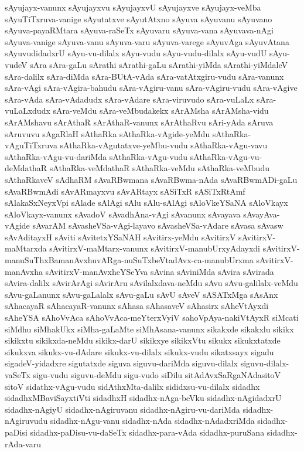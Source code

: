 {sAyujayx-vanunx
sAyujayxvu
sAyujayxvU
sAyujayxve
sAyujayx-veMba
sAyuTiTxruva-vanige
sAyutatxve
sAyutAtxno
sAyuva
sAyuvanu
sAyuvano
sAyuva-payaRMtara
sAyuva-raSeTx
sAyuvaru
sAyuva-vana
sAyuvava-nAgi
sAyuva-vanige
sAyuva-vanu
sAyuva-varu
sAyuva-varege
sAyuvAga
sAyuvAtana
sAyuvudidadxrU
sAyu-vu-dilalx
sAyu-vudu
sAyu-vudu-dilalx
sAyu-vudU
sAyu-vudeV
sAra
sAra-gaLu
sArathi
sArathi-gaLu
sArathi-yiMda
sArathi-yiMdaleV
sAra-dalilx
sAra-diMda
sAra-BUtA-vAda
sAra-vatAtxgiru-vudu
sAra-vanunx
sAra-vAgi
sAra-vAgira-bahudu
sAra-vAgiru-vanu
sAra-vAgiru-vudu
sAra-vAgive
sAra-vAda
sAra-vAdadudx
sAra-vAdare
sAra-viruvudo
sAra-vuLaLx
sAra-vuLaLxdudx
sAra-veMdu
sAra-veMbudakekx
sArAMsha
sArAMsha-vidu
sArAMshavu
sArAthaR
sArAthaR-vanunx
sArAthaRvu
sAri-yAda
sAruva
sAruvuvu
sAgaRlaH
sAthaRka
sAthaRka-vAgide-yeMdu
sAthaRka-vAguTiTxruva
sAthaRka-vAgutatxve-yeMbu-vudu
sAthaRka-vAgu-vavu
sAthaRka-vAgu-vu-dariMda
sAthaRka-vAgu-vudu
sAthaRka-vAgu-vu-deMdathaR
sAthaRka-veMdathaR
sAthaRka-veMdu
sAthaRka-veMbudu
sAthaRkaveV
sAdhaRM
sAvaRBwmana
sAvaRBwma-nAda
sAvaRBwmADi-gaLu
sAvaRBwmAdi
sAvARmayxvu
sAvARtayx
sASiTxR
sASiTxRtAmf
sAlakaSxNeyxVpi
sAlade
sAlAgi
sAlu
sAlu-sAlAgi
sAloVkeYSaNA
sAloVkayx
sAloVkayx-vanunx
sAvadoV
sAvadhAna-vAgi
sAvanunx
sAvayava
sAvayAva-vAgide
sAvarAM
sAvasheVSa-vAgi-layavo
sAvasheVSa-vAdare
sAvasa
sAvasw
sAvAditayxH
sAviti
sAvitetxYSaNAH
sAvitirx-yeMdu
sAvitirxV
sAvitirxV-maMtarxda
sAvitirxV-maMtarx-vanunx
sAvitirxV-manubUrxyAdayxdi
sAvitirxV-manuSuThxBamanAvxhuvARga-nuSuTxbeVtadAvx-ca-manubUrxma
sAvitirxV-manAvxha
sAvitirxV-manAvxheYSeYva
sAvina
sAviniMda
sAvira
sAvirada
sAvira-dalilx
sAvirArAgi
sAvirAru
sAvilalxdava-neMdu
sAvu
sAvu-galilalx-veMdu
sAvu-gaLanunx
sAvu-gaLalalx
sAvu-gaLu
sAvU
sAveV
sASATxMga
sAsAnx
sAhacayaR
sAhacayaR-vanunx
sAhasa
sAhasaveV
sAhasirx
sAheVtAyxdi
sAheYSA
sAhoVvAca
sAhoVvAca-meYterxVyiV
sahoVpAya-nakiVtAyxR
siMcati
siMdhu
siMhakUkx
siMha-gaLaMte
siMhAsana-vanunx
sikakxde
sikakxlu
sikikx
sikikxtu
sikikxda-neMdu
sikikx-darU
sikikxye
sikikxVtu
sikukx
sikukxtatxde
sikukxva
sikukx-vu-dAdare
sikukx-vu-dilalx
sikukx-vudu
sikatxsayx
sigadu
sigadeV-yidadxre
sigutatxde
siguva
siguvu-dariMda
siguvu-dilalx
siguvu-dilalx-vaSeTx
sigu-vudu
siguvu-deMdu
sigu-vudo
siDilu
sitAdAvxSaRgaNAdasitoV
sitoV
sidathx-vAgu-vudu
sidAthxMta-dalilx
sididxsu-vu-dilalx
sidadhx
sidadhxMBaviSayxtiVti
sidadhxH
sidadhx-nAga-beVku
sidadhx-nAgidadxrU
sidadhx-nAgiyU
sidadhx-nAgiruvanu
sidadhx-nAgiru-vu-dariMda
sidadhx-nAgiruvudu
sidadhx-nAgu-vanu
sidadhx-nAda
sidadhx-nAdadxriMda
sidadhx-paDisi
sidadhx-paDisu-vu-daSeTx
sidadhx-para-vAda
sidadhx-puruSana
sidadhx-rAda-varu
}

